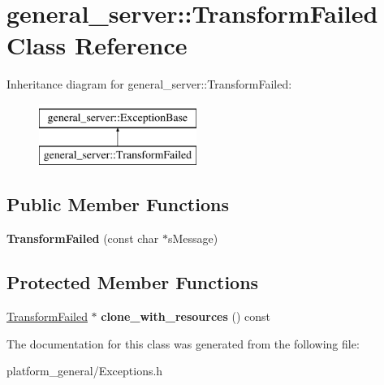 \hypertarget{classgeneral__server_1_1TransformFailed}{\section{general\-\_\-server\-:\-:\-Transform\-Failed \-Class \-Reference}
\label{classgeneral__server_1_1TransformFailed}
}
\-Inheritance diagram for general\-\_\-server\-:\-:\-Transform\-Failed\-:\begin{figure}[H]
\begin{center}
\leavevmode
\includegraphics[height=2.000000cm]{classgeneral__server_1_1TransformFailed}
\end{center}
\end{figure}
\subsection*{\-Public \-Member \-Functions}
\begin{DoxyCompactItemize}
\item 
\hypertarget{classgeneral__server_1_1TransformFailed_a006c4d53adbd724375700e0f401949c0}{{\bfseries \-Transform\-Failed} (const char $\ast$s\-Message)}\label{classgeneral__server_1_1TransformFailed_a006c4d53adbd724375700e0f401949c0}

\end{DoxyCompactItemize}
\subsection*{\-Protected \-Member \-Functions}
\begin{DoxyCompactItemize}
\item 
\hypertarget{classgeneral__server_1_1TransformFailed_a2c1f9280917dbdaa99d6344b2c49ce44}{\hyperlink{classgeneral__server_1_1TransformFailed}{\-Transform\-Failed} $\ast$ {\bfseries clone\-\_\-with\-\_\-resources} () const }\label{classgeneral__server_1_1TransformFailed_a2c1f9280917dbdaa99d6344b2c49ce44}

\end{DoxyCompactItemize}


\-The documentation for this class was generated from the following file\-:\begin{DoxyCompactItemize}
\item 
platform\-\_\-general/\-Exceptions.\-h\end{DoxyCompactItemize}
